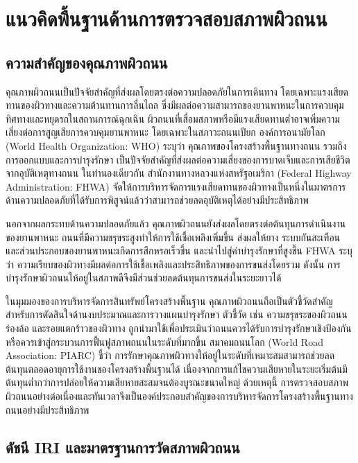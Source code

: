 \section{แนวคิดพื้นฐานด้านการตรวจสอบสภาพผิวถนน}

\subsection{ความสำคัญของคุณภาพผิวถนน}

คุณภาพผิวถนนเป็นปัจจัยสำคัญที่ส่งผลโดยตรงต่อความปลอดภัยในการเดินทาง โดยเฉพาะแรงเสียดทานของผิวทางและความต้านทานการลื่นไถล ซึ่งมีผลต่อความสามารถของยานพาหนะในการควบคุมทิศทางและหยุดรถในสถานการณ์ฉุกเฉิน ผิวถนนที่เสื่อมสภาพหรือมีแรงเสียดทานต่ำอาจเพิ่มความเสี่ยงต่อการสูญเสียการควบคุมยานพาหนะ โดยเฉพาะในสภาวะถนนเปียก องค์การอนามัยโลก (World Health Organization: WHO) ระบุว่า คุณภาพของโครงสร้างพื้นฐานทางถนน รวมถึงการออกแบบและการบำรุงรักษา เป็นปัจจัยสำคัญที่ส่งผลต่อความเสี่ยงของการบาดเจ็บและการเสียชีวิตจากอุบัติเหตุทางถนน \parencite{who2023} ในทำนองเดียวกัน สำนักงานทางหลวงแห่งสหรัฐอเมริกา (Federal Highway Administration: FHWA) จัดให้การบริหารจัดการแรงเสียดทานของผิวทางเป็นหนึ่งในมาตรการด้านความปลอดภัยที่ได้รับการพิสูจน์แล้วว่าสามารถช่วยลดอุบัติเหตุได้อย่างมีประสิทธิภาพ \parencite{fhwa2023friction}

นอกจากผลกระทบด้านความปลอดภัยแล้ว คุณภาพผิวถนนยังส่งผลโดยตรงต่อต้นทุนการดำเนินงานของยานพาหนะ ถนนที่มีความขรุขระสูงทำให้การใช้เชื้อเพลิงเพิ่มขึ้น ส่งผลให้ยาง ระบบกันสะเทือน และส่วนประกอบของยานพาหนะเกิดการสึกหรอเร็วขึ้น และนำไปสู่ค่าบำรุงรักษาที่สูงขึ้น FHWA ระบุว่า ความเรียบของผิวทางมีผลต่อการใช้เชื้อเพลิงและประสิทธิภาพของการขนส่งโดยรวม ดังนั้น การบำรุงรักษาผิวถนนให้อยู่ในสภาพดีจึงมีส่วนช่วยลดต้นทุนการขนส่งในระยะยาวได้ \parencite{fhwa2016}

ในมุมมองของการบริหารจัดการสินทรัพย์โครงสร้างพื้นฐาน คุณภาพผิวถนนถือเป็นตัวชี้วัดสำคัญสำหรับการตัดสินใจด้านงบประมาณและการวางแผนบำรุงรักษา ตัวชี้วัด เช่น ความขรุขระของผิวถนน ร่องล้อ และรอยแตกร้าวของผิวทาง ถูกนำมาใช้เพื่อประเมินว่าถนนควรได้รับการบำรุงรักษาเชิงป้องกัน หรือควรเข้าสู่กระบวนการฟื้นฟูสภาพถนนในระดับที่มากขึ้น สมาคมถนนโลก (World Road Association: PIARC) ชี้ว่า การรักษาคุณภาพผิวทางให้อยู่ในระดับที่เหมาะสมสามารถช่วยลดต้นทุนตลอดอายุการใช้งานของโครงสร้างพื้นฐานได้ เนื่องจากการแก้ไขความเสียหายในระยะเริ่มต้นมีต้นทุนต่ำกว่าการปล่อยให้ความเสียหายสะสมจนต้องบูรณะขนาดใหญ่ \parencite{piarcLifecycle} ด้วยเหตุนี้ การตรวจสอบสภาพผิวถนนอย่างต่อเนื่องและทันเวลาจึงเป็นองค์ประกอบสำคัญของการบริหารจัดการโครงสร้างพื้นฐานทางถนนอย่างมีประสิทธิภาพ

\subsection{ดัชนี IRI และมาตรฐานการวัดสภาพผิวถนน}

